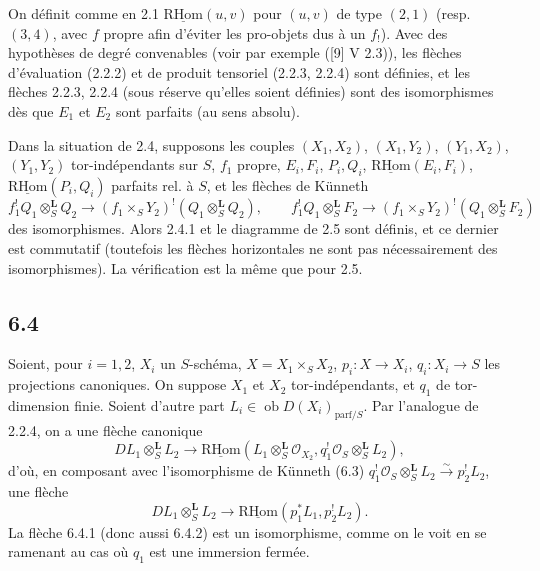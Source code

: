 \documentclass[11pt]{article}
\providecommand{\cO}{\mathcal{O}}
\providecommand{\RHom}{\mathrm{RHom}}
\providecommand{\uRHom}{\underline{\RHom}}
\providecommand{\RHom}{\mathrm{RHom}}
\providecommand{\RHom}{\mathrm R\mathcal{H}om}
\providecommand{\RHom}{\mathrm{RHom}}
\begin{document}
On définit comme en 2.1 $\uRHom(u,v)$ pour $(u,v)$ de type $(2,1)$ (resp. $(3,4)$, avec $f$ propre afin d'éviter les pro-objets dus à un $f_!$). Avec des hypothèses de degré convenables (voir par exemple ([9] V 2.3)), les flèches d'évaluation (2.2.2) et de produit tensoriel (2.2.3, 2.2.4) sont définies, et les flèches 2.2.3, 2.2.4 (sous réserve qu'elles soient définies) sont des isomorphismes dès que $E_1$ et $E_2$ sont parfaits (au sens absolu).

Dans la situation de 2.4, supposons les couples $(X_1,X_2)$, $(X_1,Y_2)$, $(Y_1,X_2)$, $(Y_1,Y_2)$ tor-indépendants sur $S$, $f_1$ propre, $E_i,F_i$, $P_i,Q_i$, $\uRHom(E_i,F_i)$, $\uRHom(P_i,Q_i)$ parfaits rel. à $S$, et les flèches de Künneth
\[
f_1^!Q_1\otimes_S^{\mathbf L}Q_2\to(f_1\times_SY_2)^!(Q_1\otimes_S^{\mathbf L}Q_2),\qquad
f_1^!Q_1\otimes_S^{\mathbf L}F_2\to(f_1\times_SY_2)^!(Q_1\otimes_S^{\mathbf L}F_2)
\]
des isomorphismes. Alors 2.4.1 et le diagramme de 2.5 sont définis, et ce dernier est commutatif (toutefois les flèches horizontales ne sont pas nécessairement des isomorphismes). La vérification est la même que pour 2.5.

\subsection*{6.4}
Soient, pour $i=1,2$, $X_i$ un $S$-schéma, $X=X_1\times_SX_2$, $p_i:X\to X_i$, $q_i:X_i\to S$ les projections canoniques. On suppose $X_1$ et $X_2$ tor-indépendants, et $q_1$ de tor-dimension finie. Soient d'autre part $L_i\in\operatorname{ob}D(X_i)_{\mathrm{parf}/S}$. Par l'analogue de 2.2.4, on a une flèche canonique
\begin{equation}
\tag{6.4.1}
DL_1\otimes_S^{\mathbf L}L_2\longrightarrow \uRHom(L_1\otimes_S^{\mathbf L}\cO_{X_2},q_1^!\cO_S\otimes_S^{\mathbf L}L_2),
\end{equation}
d'où, en composant avec l'isomorphisme de Künneth (6.3) $q_1^!\cO_S\otimes_S^{\mathbf L}L_2\xrightarrow{\sim}p_2^!L_2$, une flèche
\begin{equation}
\tag{6.4.2}
DL_1\otimes_S^{\mathbf L}L_2\longrightarrow\uRHom(p_1^*L_1,p_2^!L_2).
\end{equation}
La flèche 6.4.1 (donc aussi 6.4.2) est un isomorphisme, comme on le voit en se ramenant au cas où $q_1$ est une immersion fermée.
\end{document}
